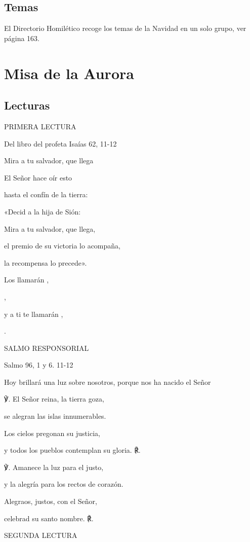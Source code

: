 \section{Temas}

El Directorio Homilético recoge los temas de la Navidad en un solo
grupo, ver página 163.

\chapter{Misa de la Aurora}

\section{Lecturas}

PRIMERA LECTURA

Del libro del profeta Isaías 62, 11-12

Mira a tu salvador, que llega

El Señor hace oír esto

hasta el confín de la tierra:

«Decid a la hija de Sión:

Mira a tu salvador, que llega,

el premio de su victoria lo acompaña,

la recompensa lo precede».

Los llamarán ,

,

y a ti te llamarán ,

.

SALMO RESPONSORIAL

Salmo 96, 1 y 6. 11-12

Hoy brillará una luz sobre nosotros, porque nos ha nacido el Señor

℣. El Señor reina, la tierra goza,

se alegran las islas innumerables.

Los cielos pregonan su justicia,

y todos los pueblos contemplan su gloria. ℟.

℣. Amanece la luz para el justo,

y la alegría para los rectos de corazón.

Alegraos, justos, con el Señor,

celebrad su santo nombre. ℟.

SEGUNDA LECTURA

